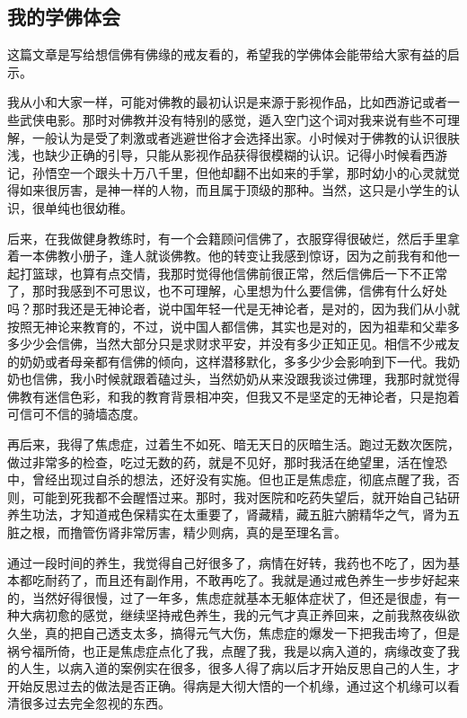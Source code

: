 \subsection{我的学佛体会}

这篇文章是写给想信佛有佛缘的戒友看的，希望我的学佛体会能带给大家有益的启示。

我从小和大家一样，可能对佛教的最初认识是来源于影视作品，比如西游记或者一些武侠电影。那时对佛教并没有特别的感觉，遁入空门这个词对我来说有些不可理解，一般认为是受了刺激或者逃避世俗才会选择出家。小时候对于佛教的认识很肤浅，也缺少正确的引导，只能从影视作品获得很模糊的认识。记得小时候看西游记，孙悟空一个跟头十万八千里，但他却翻不出如来的手掌，那时幼小的心灵就觉得如来很厉害，是神一样的人物，而且属于顶级的那种。当然，这只是小学生的认识，很单纯也很幼稚。

后来，在我做健身教练时，有一个会籍顾问信佛了，衣服穿得很破烂，然后手里拿着一本佛教小册子，逢人就谈佛教。他的转变让我感到惊讶，因为之前我有和他一起打篮球，也算有点交情，我那时觉得他信佛前很正常，然后信佛后一下不正常了，那时我感到不可思议，也不可理解，心里想为什么要信佛，信佛有什么好处吗？那时我还是无神论者，说中国年轻一代是无神论者，是对的，因为我们从小就按照无神论来教育的，不过，说中国人都信佛，其实也是对的，因为祖辈和父辈多多少少会信佛，当然大部分只是求财求平安，并没有多少正知正见。相信不少戒友的奶奶或者母亲都有信佛的倾向，这样潜移默化，多多少少会影响到下一代。我奶奶也信佛，我小时候就跟着磕过头，当然奶奶从来没跟我谈过佛理，我那时就觉得佛教有迷信色彩，和我的教育背景相冲突，但我又不是坚定的无神论者，只是抱着可信可不信的骑墙态度。

再后来，我得了焦虑症，过着生不如死、暗无天日的灰暗生活。跑过无数次医院，做过非常多的检查，吃过无数的药，就是不见好，那时我活在绝望里，活在惶恐中，曾经出现过自杀的想法，还好没有实施。但也正是焦虑症，彻底点醒了我，否则，可能到死我都不会醒悟过来。那时，我对医院和吃药失望后，就开始自己钻研养生功法，才知道戒色保精实在太重要了，肾藏精，藏五脏六腑精华之气，肾为五脏之根，而撸管伤肾非常厉害，精少则病，真的是至理名言。

通过一段时间的养生，我觉得自己好很多了，病情在好转，我药也不吃了，因为基本都吃耐药了，而且还有副作用，不敢再吃了。我就是通过戒色养生一步步好起来的，当然好得很慢，过了一年多，焦虑症就基本无躯体症状了，但还是很虚，有一种大病初愈的感觉，继续坚持戒色养生，我的元气才真正养回来，之前我熬夜纵欲久坐，真的把自己透支太多，搞得元气大伤，焦虑症的爆发一下把我击垮了，但是祸兮福所倚，也正是焦虑症点化了我，点醒了我，我是以病入道的，病缘改变了我的人生，以病入道的案例实在很多，很多人得了病以后才开始反思自己的人生，才开始反思过去的做法是否正确。得病是大彻大悟的一个机缘，通过这个机缘可以看清很多过去完全忽视的东西。

